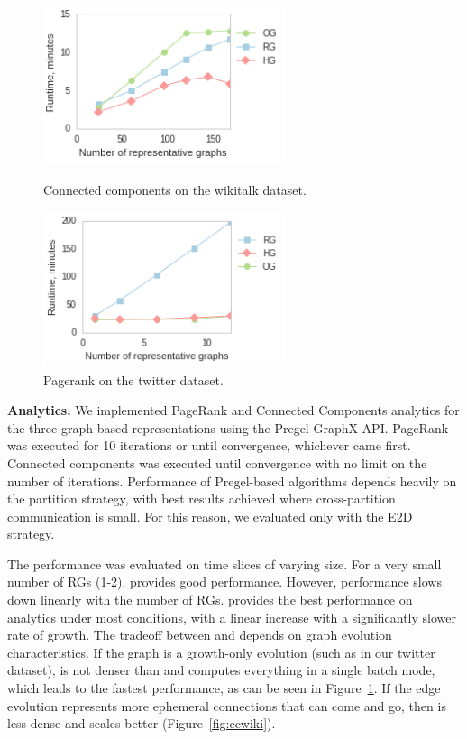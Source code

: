 \begin{figure}[h]
\centering
\begin{minipage}{3.3in}
\centering
\includegraphics[width=2.8in]{figs/cc_wikitalk_build12.png}
\caption{Connected components on the wikitalk dataset.}
\label{fig:ccwiki}
\end{minipage}
\begin{minipage}{3.3in}
\centering
\includegraphics[width=2.8in]{figs/prank_twitter_build12.png}
\caption{Pagerank on the twitter dataset.}
\label{fig:pranktwitter}
\end{minipage}
\end{figure}

{\bf Analytics.}  We implemented PageRank and Connected Components
analytics for the three graph-based representations using the Pregel
GraphX API.  PageRank was executed for 10 iterations or until
convergence, whichever came first.  Connected components was executed
until convergence with no limit on the number of iterations.
Performance of Pregel-based algorithms depends heavily on the
partition strategy, with best results achieved where cross-partition
communication is small.  For this reason, we evaluated only with the
E2D strategy.

The performance was evaluated on time slices of varying size.  For a
very small number of RGs (1-2), \sg provides good performance.
However, \sg performance slows down linearly with the number of RGs.
\hg provides the best performance on analytics under most conditions,
with a linear increase with a significantly slower rate of growth.
The tradeoff between \og and \hg depends on graph evolution
characteristics.  If the graph is a growth-only evolution (such as in
our twitter dataset), \og is not denser than \hg and computes
everything in a single batch mode, which leads to the fastest
performance, as can be seen in Figure~\ref{fig:pranktwitter}.  If the
edge evolution represents more ephemeral connections that can come and
go, then \hg is less dense and scales better
(Figure~\ref{fig:ccwiki}).


